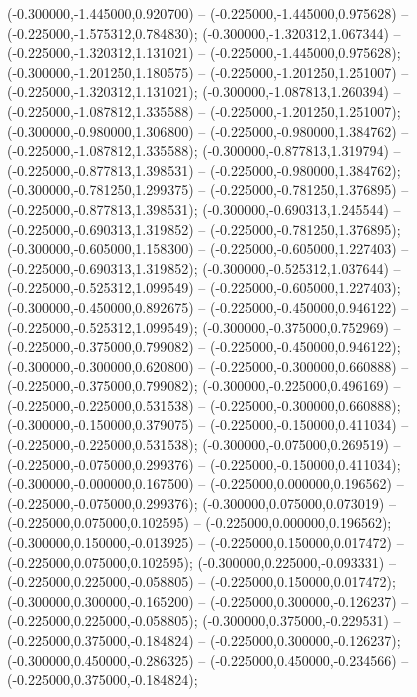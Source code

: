  (-0.300000,-1.445000,0.920700) -- (-0.225000,-1.445000,0.975628) -- (-0.225000,-1.575312,0.784830);
 (-0.300000,-1.320312,1.067344) -- (-0.225000,-1.320312,1.131021) -- (-0.225000,-1.445000,0.975628);
 (-0.300000,-1.201250,1.180575) -- (-0.225000,-1.201250,1.251007) -- (-0.225000,-1.320312,1.131021);
 (-0.300000,-1.087813,1.260394) -- (-0.225000,-1.087812,1.335588) -- (-0.225000,-1.201250,1.251007);
 (-0.300000,-0.980000,1.306800) -- (-0.225000,-0.980000,1.384762) -- (-0.225000,-1.087812,1.335588);
 (-0.300000,-0.877813,1.319794) -- (-0.225000,-0.877813,1.398531) -- (-0.225000,-0.980000,1.384762);
 (-0.300000,-0.781250,1.299375) -- (-0.225000,-0.781250,1.376895) -- (-0.225000,-0.877813,1.398531);
 (-0.300000,-0.690313,1.245544) -- (-0.225000,-0.690313,1.319852) -- (-0.225000,-0.781250,1.376895);
 (-0.300000,-0.605000,1.158300) -- (-0.225000,-0.605000,1.227403) -- (-0.225000,-0.690313,1.319852);
 (-0.300000,-0.525312,1.037644) -- (-0.225000,-0.525312,1.099549) -- (-0.225000,-0.605000,1.227403);
 (-0.300000,-0.450000,0.892675) -- (-0.225000,-0.450000,0.946122) -- (-0.225000,-0.525312,1.099549);
 (-0.300000,-0.375000,0.752969) -- (-0.225000,-0.375000,0.799082) -- (-0.225000,-0.450000,0.946122);
 (-0.300000,-0.300000,0.620800) -- (-0.225000,-0.300000,0.660888) -- (-0.225000,-0.375000,0.799082);
 (-0.300000,-0.225000,0.496169) -- (-0.225000,-0.225000,0.531538) -- (-0.225000,-0.300000,0.660888);
 (-0.300000,-0.150000,0.379075) -- (-0.225000,-0.150000,0.411034) -- (-0.225000,-0.225000,0.531538);
 (-0.300000,-0.075000,0.269519) -- (-0.225000,-0.075000,0.299376) -- (-0.225000,-0.150000,0.411034);
 (-0.300000,-0.000000,0.167500) -- (-0.225000,0.000000,0.196562) -- (-0.225000,-0.075000,0.299376);
 (-0.300000,0.075000,0.073019) -- (-0.225000,0.075000,0.102595) -- (-0.225000,0.000000,0.196562);
 (-0.300000,0.150000,-0.013925) -- (-0.225000,0.150000,0.017472) -- (-0.225000,0.075000,0.102595);
 (-0.300000,0.225000,-0.093331) -- (-0.225000,0.225000,-0.058805) -- (-0.225000,0.150000,0.017472);
 (-0.300000,0.300000,-0.165200) -- (-0.225000,0.300000,-0.126237) -- (-0.225000,0.225000,-0.058805);
 (-0.300000,0.375000,-0.229531) -- (-0.225000,0.375000,-0.184824) -- (-0.225000,0.300000,-0.126237);
 (-0.300000,0.450000,-0.286325) -- (-0.225000,0.450000,-0.234566) -- (-0.225000,0.375000,-0.184824);

